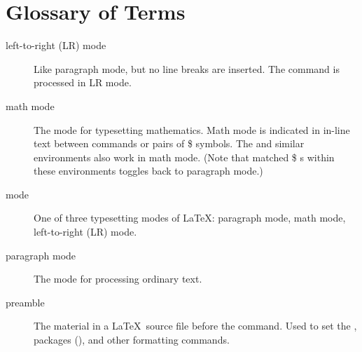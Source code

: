 \chapter{Glossary of Terms}
\label{chap.glossary}
\begin{description}
\item[left-to-right (LR) mode] Like paragraph mode, but no line breaks are inserted. The  command is processed in LR mode.
\item[math mode] The mode for typesetting mathematics. 
Math mode is indicated in in-line text between \cmmd{(}  \cmmd{)} commands or pairs of \$ symbols.
The  and similar environments also work in math mode.
(Note that matched \$ s within these environments toggles back to paragraph mode.)
\item[mode] One of three typesetting modes of \LaTeX : paragraph mode, math mode, left-to-right (LR) mode.
\item[paragraph mode] The mode for processing ordinary text.
\item[preamble] The material in a \LaTeX\ source file before the 
\verb== command. 
Used to set the , packages (), and other formatting commands.
\end{description}
